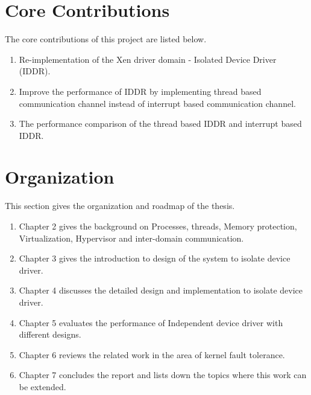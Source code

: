 \section{Core Contributions}

The core contributions of this project are listed below. 

\begin{enumerate}
\item Re-implementation of the Xen driver domain - Isolated Device Driver (IDDR).
\item Improve the performance of IDDR by implementing thread based communication channel instead of interrupt based communication channel. 
\item The performance comparison of the thread based IDDR and interrupt based IDDR.
\end{enumerate}

\pagebreak
\section {Organization}

This section gives the organization and roadmap of the thesis.

\begin{enumerate}
\item Chapter 2 gives the background on Processes, threads, Memory protection, Virtualization, Hypervisor and inter-domain communication.
\item Chapter 3 gives the introduction to design of the system to isolate device driver. 
\item Chapter 4 discusses the detailed design and implementation to isolate device driver. 
\item Chapter 5 evaluates the performance of Independent device driver with different designs.
\item Chapter 6 reviews the related work in the area of kernel fault tolerance.
\item Chapter 7 concludes the report and lists down the topics where this work can be extended.
\end{enumerate}

